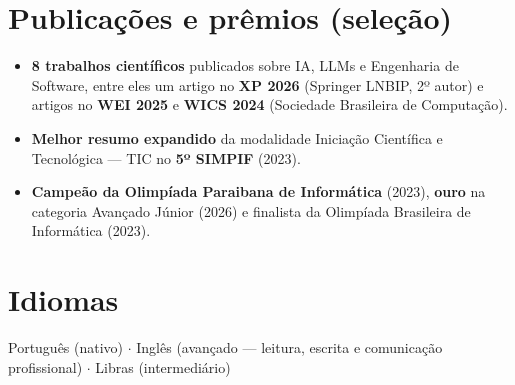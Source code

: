 \documentclass[10.5pt,a4paper]{article}
\begin{document}
\section*{Publicações e prêmios (seleção)}
\begin{itemize}
  \item \textbf{8 trabalhos científicos} publicados sobre IA, LLMs e Engenharia de Software, entre
        eles um artigo no \textbf{XP 2026} (Springer LNBIP, 2º autor) e artigos no \textbf{WEI 2025}
        e \textbf{WICS 2024} (Sociedade Brasileira de Computação).
  \item \textbf{Melhor resumo expandido} da modalidade Iniciação Científica e Tecnológica --- TIC no
        \textbf{5º SIMPIF} (2023).
  \item \textbf{Campeão da Olimpíada Paraibana de Informática} (2023), \textbf{ouro} na categoria
        Avançado Júnior (2026) e finalista da Olimpíada Brasileira de Informática (2023).
\end{itemize}

\section*{Idiomas}
Português (nativo) $\cdot$ Inglês (avançado --- leitura, escrita e comunicação profissional)
$\cdot$ Libras (intermediário)
\end{document}
